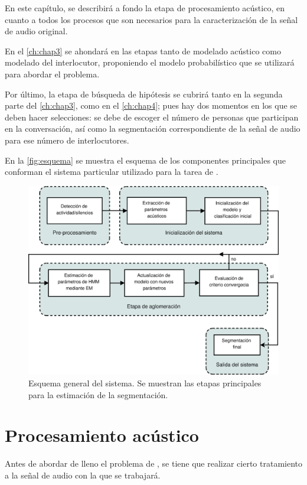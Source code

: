En este capítulo, se describirá a fondo la etapa de procesamiento acústico, en cuanto a todos los procesos que son necesarios para la caracterización de la señal de audio original.

En el \autoref{ch:chap3} se ahondará en las etapas tanto de modelado acústico como modelado del interlocutor, proponiendo el modelo probabilístico que se utilizará para abordar el problema.

Por último, la etapa de búsqueda de hipótesis se cubrirá tanto en la segunda parte del \autoref{ch:chap3}, como en el \autoref{ch:chap4}; pues hay dos momentos en los que se deben hacer selecciones: se debe de escoger el número de personas que participan en la conversación, así como la segmentación correspondiente de la señal de audio para ese número de interlocutores.

En la \autoref{fig:esquema} se muestra el esquema de los componentes principales que conforman el sistema particular utilizado para la tarea de \sd.

\begin{figure}[ht]
  \centerline
  {\includegraphics[width=1.4\linewidth]{gfx/chap2/ASR_flow}} \quad
  \caption{Esquema general del sistema. Se muestran las etapas principales para la estimación de la segmentación.}
  \label{fig:esquema}
\end{figure}


\section{Procesamiento acústico}

Antes de abordar de lleno el problema de \sd, se tiene que realizar cierto tratamiento a la señal de audio con la que se trabajará. 

